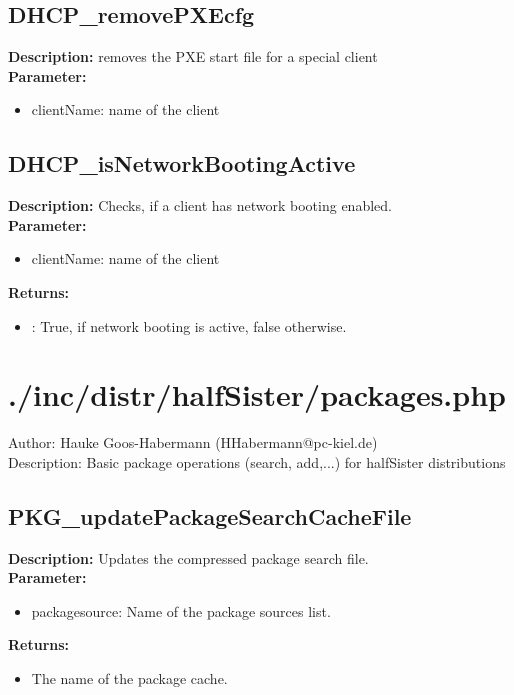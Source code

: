 \subsection{DHCP\_removePXEcfg}
\textbf{Description:} removes the PXE start file for a special client\\
\textbf{Parameter:}
\begin{itemize}
\item clientName: name of the client
\end{itemize}

\subsection{DHCP\_isNetworkBootingActive}
\textbf{Description:} Checks, if a client has network booting enabled.\\
\textbf{Parameter:}
\begin{itemize}
\item clientName: name of the client
\end{itemize}
\textbf{Returns:}
\begin{itemize}
\item : True, if network booting is active, false otherwise.
\end{itemize}

\newpage\section{./inc/distr/halfSister/packages.php}
Author: Hauke Goos-Habermann (HHabermann@pc-kiel.de)\\
Description: Basic package operations (search, add,...) for halfSister distributions\\

\subsection{PKG\_updatePackageSearchCacheFile}
\textbf{Description:} Updates the compressed package search file.\\
\textbf{Parameter:}
\begin{itemize}
\item packagesource: Name of the package sources list.
\end{itemize}
\textbf{Returns:}
\begin{itemize}
\item The name of the package cache.
\end{itemize}

